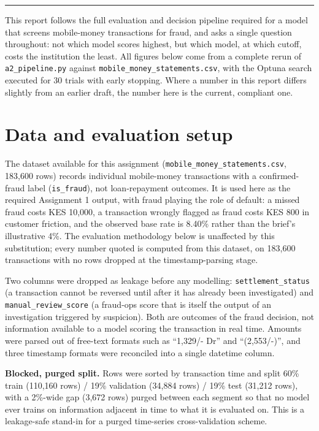 \documentclass[11pt,a4paper]{article}
\begin{document}
\vspace{4pt}
\hrule
\vspace{8pt}

This report follows the full evaluation and decision pipeline required for a model that screens mobile-money transactions for fraud, and asks a single question throughout: not which model scores highest, but which model, at which cutoff, costs the institution the least. All figures below come from a complete rerun of \texttt{a2\_pipeline.py} against \texttt{mobile\_money\_statements.csv}, with the Optuna search executed for 30 trials with early stopping. Where a number in this report differs slightly from an earlier draft, the number here is the current, compliant one.

\section{Data and evaluation setup}

The dataset available for this assignment (\texttt{mobile\_money\_statements.csv}, 183,600 rows) records individual mobile-money transactions with a confirmed-fraud label (\texttt{is\_fraud}), not loan-repayment outcomes. It is used here as the required Assignment 1 output, with fraud playing the role of default: a missed fraud costs KES 10,000, a transaction wrongly flagged as fraud costs KES 800 in customer friction, and the observed base rate is 8.40\% rather than the brief's illustrative 4\%. The evaluation methodology below is unaffected by this substitution; every number quoted is computed from this dataset, on 183,600 transactions with no rows dropped at the timestamp-parsing stage.

Two columns were dropped as leakage before any modelling: \texttt{settlement\_status} (a transaction cannot be reversed until after it has already been investigated) and \texttt{manual\_review\_score} (a fraud-ops score that is itself the output of an investigation triggered by suspicion). Both are outcomes of the fraud decision, not information available to a model scoring the transaction in real time. Amounts were parsed out of free-text formats such as ``1,329/- Dr'' and ``(2,553/-)'', and three timestamp formats were reconciled into a single datetime column.

\textbf{Blocked, purged split.} Rows were sorted by transaction time and split 60\% train (110,160 rows) / 19\% validation (34,884 rows) / 19\% test (31,212 rows), with a 2\%-wide gap (3,672 rows) purged between each segment so that no model ever trains on information adjacent in time to what it is evaluated on. This is a leakage-safe stand-in for a purged time-series cross-validation scheme.
\end{document}
